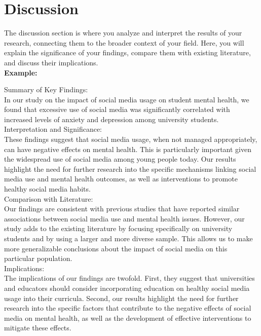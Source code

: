 \documentclass[openany]{book}
\numberwithin{figure}{chapter}
\numberwithin{equation}{chapter}
\begin{document}
\chapter{Discussion}
The discussion section is where you analyze and interpret the results of your research, connecting them to the broader context of your field. Here, you will explain the significance of your findings, compare them with existing literature, and discuss their implications.\\

{\bf Example:}

Summary of Key Findings:\\
In our study on the impact of social media usage on student mental health, we found that excessive use of social media was significantly correlated with increased levels of anxiety and depression among university students.\\

Interpretation and Significance:\\
These findings suggest that social media usage, when not managed appropriately, can have negative effects on mental health. This is particularly important given the widespread use of social media among young people today. Our results highlight the need for further research into the specific mechanisms linking social media use and mental health outcomes, as well as interventions to promote healthy social media habits.\\

Comparison with Literature:\\
Our findings are consistent with previous studies that have reported similar associations between social media use and mental health issues. However, our study adds to the existing literature by focusing specifically on university students and by using a larger and more diverse sample. This allows us to make more generalizable conclusions about the impact of social media on this particular population.\\

Implications:\\
The implications of our findings are twofold. First, they suggest that universities and educators should consider incorporating education on healthy social media usage into their curricula. Second, our results highlight the need for further research into the specific factors that contribute to the negative effects of social media on mental health, as well as the development of effective interventions to mitigate these effects.
\end{document}
